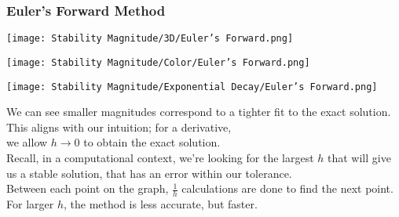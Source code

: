\subsubsection{Euler's Forward Method}
\begin{multicols}{2}
	\begin{center}
	\texttt{[image: Stability Magnitude/3D/Euler's Forward.png]}
	\end{center}
	\columnbreak{}
	\begin{center}
	\texttt{[image: Stability Magnitude/Color/Euler's Forward.png]}
	\end{center}
\end{multicols}
\begin{multicols}{2}
	\begin{center}
		\texttt{[image: Stability Magnitude/Exponential Decay/Euler's Forward.png]}
	\end{center}
	\columnbreak{}
	We can see smaller magnitudes correspond to a tighter fit to the exact solution.\\
	This aligns with our intuition; for a derivative,\\
	we allow $h \rightarrow 0$ to obtain the exact solution.\\
	Recall, in a computational context, we're looking for the largest $h$ that will give us a stable solution, that has an error within our tolerance.\\
	Between each point on the graph, $\frac{1}{h}$ calculations are done to find the next point.\\
	For larger $h$, the method is less accurate, but faster.\\
\end{multicols}

\newpage
